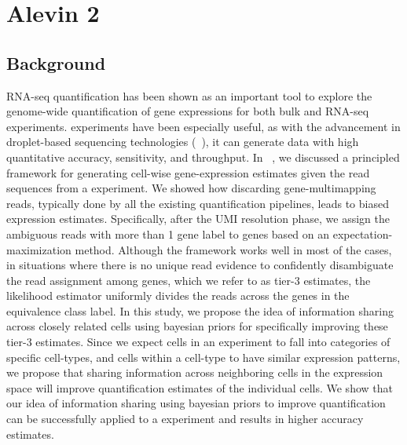
\chapter{Alevin 2} %

\label{alevin2} %


\section{Background}

RNA-seq quantification has been shown as an important tool to explore the genome-wide
quantification of gene expressions for both bulk and \singlecell RNA-seq experiments.
\dscrnaseq experiments have been especially useful, as with the advancement in droplet-based 
sequencing technologies (~\citep{dropseq, indrop, tenx}), it can generate data with high 
quantitative accuracy, sensitivity, and throughput. In ~, we discussed a 
principled framework for generating cell-wise gene-expression estimates given the read sequences
from a \dscrnaseq experiment. We showed how discarding gene-multimapping reads, typically done 
by all the existing \dscrnaseq quantification pipelines, leads to biased expression estimates. 
Specifically, after the UMI resolution phase, we assign the ambiguous reads with more than 1 gene label to
genes based on an expectation-maximization method. Although the framework works well in most of the cases, 
in situations where there is no unique read evidence to confidently disambiguate the read assignment
among genes, which we refer to as tier-3 estimates, the likelihood estimator uniformly divides the reads 
across the genes in the equivalence class label. In this study, we propose the idea of information sharing across closely 
related cells using bayesian priors for specifically improving these tier-3 estimates. Since we expect cells in an experiment
to fall into categories of specific cell-types, and cells within a cell-type to have similar expression patterns, we propose that
sharing information across neighboring cells in the expression space will improve quantification 
estimates of the individual cells. We show that our idea of information sharing using bayesian 
priors to improve quantification can be successfully applied to a \dscrnaseq experiment and results in higher accuracy estimates.

